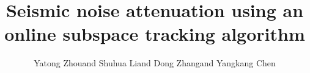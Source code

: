 \title{Seismic noise attenuation using an online subspace tracking algorithm}
\author{Yatong Zhou\footnotemark[1] and Shuhua Li\footnotemark[1] and Dong Zhang\footnotemark[2] and Yangkang Chen\footnotemark[3]}

\address{
\footnotemark[1] School of Electronic and Information Engineering \\
Hebei University of Technology \\
Xiping Road No. 5340, Beichen District\\
Tianjin, China, 300401 \\
zyt\_htu@126.com \\ 
\footnotemark[2] Departments of Imaging Physics \\
Delft university of technology \\
D.Zhang-3@tudelft.nl \\
\footnotemark[3] Previously: Bureau of Economic Geology \\
John A. and Katherine G. Jackson School of Geosciences \\
The University of Texas at Austin \\
University Station, Box X \\
Austin, TX 78713-8924 \\
Currently: National Center for Computational Sciences \\
Oak Ridge National Laboratory \\
One Bethel Valley Road, \\
Oak Ridge, TN 37831-6008 \\
Email: chenyk2016@gmail.com\\
}
\DeclareRobustCommand{\dlo}[1]{\ifthenelse{\boolean{@revd}}{}{}}
\DeclareRobustCommand{\wen}[1]{%
  \ifthenelse{\boolean{@revd}}{\textcolor{black}{#1}}{#1}}
  
	
